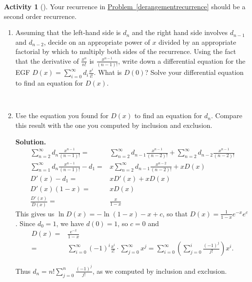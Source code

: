 \documentclass[10pt,]{book}
\theoremstyle{plain}
\theoremstyle{definition}
\newtheorem{activity}[project]{Activity}
\numberwithin{equation}{chapter}
\newcommand{\amp}{&}
\begin{document}
\begin{activity}[]\label{exponentialderangements}
Your recurrence in \hyperref[derangementrecurrence]{Problem~\ref{derangementrecurrence}} should be a second order recurrence.%
~\par
\begin{enumerate}[label=(\alph*)]
 \item Assuming that the left-hand side is \(d_n\) and the right hand side involves \(d_{n-1}\) and \(d_{n-2}\), decide on an appropriate power of \(x\) divided by an appropriate factorial by which to multiply both sides of the recurrence.  Using the fact that the derivative of \(\frac{x^n}{n!}\) is \(\frac{x^{n-1}}{(n-1)!}\), write down a differential equation for the EGF \(D(x) =
\sum_{i=0}^\infty d_i\frac{x^i}{i!}\). What is \(D(0)\)?  Solve your differential equation to find an equation for \(D(x)\).%

~\par
\item Use the equation you found for \(D(x)\) to find an equation for \(d_n\).  Compare this result with the one you computed by inclusion and exclusion.%
\par\medskip\noindent%
\textbf{Solution.}\quad %
\begin{align*}
\sum_{n=2}^\infty d_n\frac{x^{n-1}}{(n-1)!}
=\amp \sum_{n=2}^\infty d_{n-1}\frac{x^{n-1}}{(n-2)!} +\sum_{n=2}^\infty
d_{n-2}\frac{x^{n-1}}{(n-2)!}\\
\sum_{n=1}^\infty d_n\frac{x^{n-1}}{(n-1)!} -d_1  =\amp
x\sum_{n=2}^\infty d_{n-1}\frac{x^{n-2}}{(n-2)!} +xD(x)\\
D'(x) -d_1  =\amp  xD'(x) +xD(x)\\
D'(x)(1-x)  =\amp  xD(x)\\
\frac{D'(x)}{D(x)}  =\amp  \frac{x}{1-x}
\end{align*}
This gives us \(\ln D(x) = -\ln(1-x) -x +c\), so that \(D(x) = \frac{1}{1-x}e^{-x}e^c\). Since \(d_0=1\), we have \(d(0)=1\), so \(c=0\) and%
\begin{align*}
D(x)  =\amp  \frac{e^{-x}}{1-x}\\
=\amp
\sum_{i=0}^\infty(-1)^i\frac{x^i}{i!}\cdot\sum_{j=0}^\infty
x^j=\sum_{i=0}^\infty\left(\sum_{j=0}^i \frac{(-1)^j}{j!}\right)
x^i.
\end{align*}
%
\par
Thus \(d_n = n!\sum_{j=0}^n\frac{(-1)^j}{j!}\), as we computed by inclusion and exclusion.%

\end{enumerate}
\end{activity}
\typeout{************************************************}
\typeout{************************************************}
\end{document}
